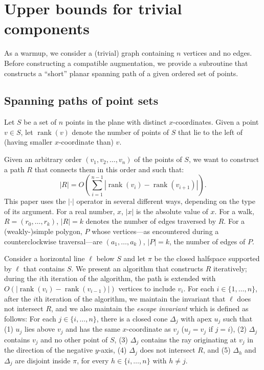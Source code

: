 \documentclass[11pt]{patmorin}
\DeclareMathOperator{\rank}{rank}
\begin{document}
\section{Upper bounds for trivial components}\label{section:Trivial components}
As a warmup, we consider a (trivial) graph containing $n$ vertices and no edges.
Before constructing a compatible augmentation, we provide a subroutine
that constructs a ``short'' planar spanning path of a given ordered set of points.

\subsection{Spanning paths of point sets}
Let $S$ be a set of $n$ points in the plane with distinct $x$-coordinates. 
Given a point $v\in S$, let $\rank(v)$ denote the number of points of $S$ that lie to the left of (having smaller $x$-coordinate than) $v$.

Given an arbitrary order $(v_1, v_2, \ldots, v_n)$ of the points of $S$, we want to construct a path $R$ that connects them in this order and such that:  
\[
   |R|  = O\left(\sum_{i=1}^{n-1} |\rank(v_i) - \rank(v_{i+1})| \right).
\]
This paper uses the $|\cdot|$ operator in several different ways, depending on the type of its argument.  For a real number, $x$, $|x|$ is the absolute value of $x$.  For a walk, $R=(r_0,\ldots,r_k)$, $|R|=k$ denotes the number of edges traversed by $R$. For a (weakly-)simple polygon, $P$ whose vertices---as encountered during a counterclockwise traversal---are $(a_1,\ldots,a_k)$, $|P|=k$, the number of edges of $P$.

Consider a horizontal line $\ell$ below $S$ and let $\pi$ be the closed halfspace supported by $\ell$ that contains $S$.  We present an algorithm that constructs $R$ iteratively; during the $i$th iteration of the algorithm, the path is extended with $O(|\rank(v_i) - \rank(v_{i-1})|)$ vertices to include $v_i$.  For each $i\in \{1,\dots,n\}$, after the $i$th iteration of the algorithm, we maintain the invariant that $\ell$ does not intersect $R$, and we also maintain the \emph{escape invariant} which is defined as follows:
For each $j\in \{i, \dots, n\}$, there is a closed cone $\Delta_{j}$ with apex $u_{j}$ such that (1) $u_j$ lies above $v_j$ and has the same $x$-coordinate as $v_j$ ($u_j =v_j$ if $j = i$), (2) $\Delta_j$ contains $v_j$ and no other point of $S$, (3) $\Delta_j$ contains the ray originating at $v_j$ in the direction of the negative $y$-axis, (4) $\Delta_j$ does not intersect $R$, and (5) $\Delta_h$ and $\Delta_j$ are disjoint inside $\pi$, for every $h\in \{i,\dots,n\}$ with $h\neq j$.
\end{document}
